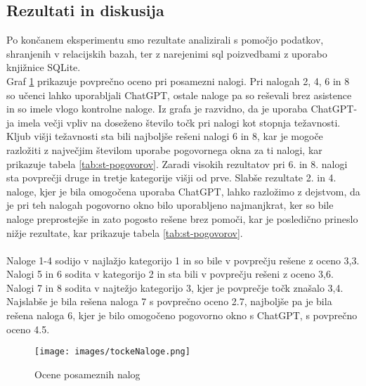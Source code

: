 \documentclass[a4paper,12pt,openright]{book}
\begin{document}
\subsection{Rezultati in diskusija}
Po končanem eksperimentu smo rezultate analizirali s pomočjo podatkov, shranjenih v relacijskih bazah, ter z narejenimi sql poizvedbami z uporabo knjižnice SQLite. \\
Graf \ref{fig:grade_all} prikazuje povprečno oceno pri posamezni nalogi. Pri nalogah 2, 4, 6 in 8 so učenci lahko uporabljali ChatGPT, ostale naloge pa so reševali brez asistence in so imele vlogo kontrolne naloge. Iz grafa je razvidno, da je uporaba ChatGPT-ja imela večji vpliv na doseženo število točk pri nalogi  kot stopnja težavnosti. Kljub višji težavnosti sta bili najboljše rešeni nalogi 6 in 8, kar je mogoče razložiti z največjim številom uporabe pogovornega okna za ti nalogi, kar prikazuje tabela \ref{tab:st-pogovorov}.
Zaradi visokih rezultatov pri 6. in 8. nalogi sta povprečji druge in tretje kategorije višji od prve.
Slabše rezultate 2. in 4. naloge, kjer je bila omogočena uporaba ChatGPT, lahko razložimo z dejstvom, da je pri teh nalogah pogovorno okno bilo uporabljeno najmanjkrat, ker so bile naloge preprostejše in zato pogosto rešene brez pomoči, kar je posledično prineslo nižje rezultate, kar prikazuje tabela \ref{tab:st-pogovorov}. \\
\\ Naloge 1-4 sodijo v najlažjo kategorijo 1 in so bile v povprečju rešene z oceno 3,3. Nalogi 5 in 6 sodita v kategorijo 2 in sta bili v povprečju rešeni z oceno 3,6. Nalogi 7 in 8 sodita v najtežjo kategorijo 3, kjer je povprečje točk znašalo 3,4. Najslabše je bila rešena naloga 7 s povprečno oceno 2.7, najboljše pa je bila rešena naloga 6, kjer je bilo omogočeno pogovorno okno s ChatGPT, s povprečno oceno 4.5.

\begin{figure}[H]
    \centering
    \texttt{[image: images/tockeNaloge.png]}
    \caption{Ocene posameznih nalog}
    \label{fig:grade_all}
\end{figure}
\end{document}
